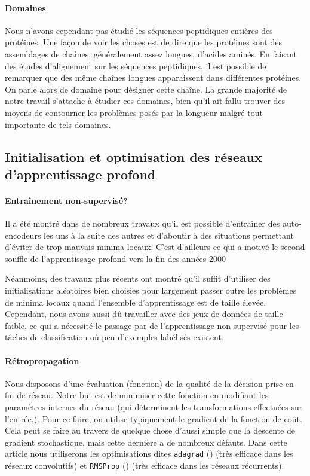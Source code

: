 \documentclass[a4paper, 11pt, onecolumn]{article}
\begin{document}
\paragraph{Domaines}

Nous n'avons cependant pas étudié les séquences peptidiques entières des
protéines. Une façon de voir les choses est de dire que les protéines sont des
assemblages de chaînes, généralement assez longues, d'acides aminés. En faisant
des études d'alignement sur les séquences peptidiques, il est possible de
remarquer que des même chaînes longues apparaissent dans différentes protéines.
On parle alors de domaine pour désigner cette chaîne.
 La grande majorité de notre travail s'attache à
étudier ces domaines, bien qu'il ait fallu trouver des moyens de contourner les
problèmes posés par la longueur malgré tout importante de tels domaines. 

\subsection{Initialisation et optimisation des réseaux d'apprentissage profond}

\paragraph{Entraînement non-supervisé?}

Il a été montré dans de nombreux travaux qu'il est possible d'entraîner des
auto-encodeurs les uns à la suite des autres et d'aboutir à des situations permettant
d'éviter de trop mauvais minima locaux. C'est d'ailleurs ce qui a motivé le
second souffle de l'apprentissage profond vers la fin des années 2000

Néanmoins, des travaux plus récents ont montré qu'il suffit d'utiliser des
initialisations aléatoires bien choisies pour largement passer outre les problèmes
de minima locaux quand l'ensemble d'apprentissage est de taille élevée. Cependant, nous avons aussi dû travailler avec des jeux de
données de taille faible, ce qui a nécessité le passage par de l'apprentissage
non-supervisé pour les tâches de classification où peu d'exemples labélisés existent.

\paragraph{Rétropropagation}

Nous disposons d'une évaluation (fonction) de la qualité de la décision prise en fin de réseau. Notre but est de
minimiser cette fonction en modifiant les paramètres internes du réseau (qui
déterminent les transformations effectuées sur l'entrée.). Pour ce faire, on
utilise typiquement le gradient de la fonction de coût. Cela peut se faire au
travers de quelque chose d'aussi simple que la descente de gradient stochastique, mais cette
dernière a de nombreux défauts. Dans cette article nous utiliserons les
optimisations dites \texttt{adagrad} (\cite{duchi2011adaptive}) (très efficace dans les réseaux
convolutifs) et \texttt{RMSProp} (\cite{hintonlecture}) (très efficace dans les réseaux récurrents).
\end{document}

